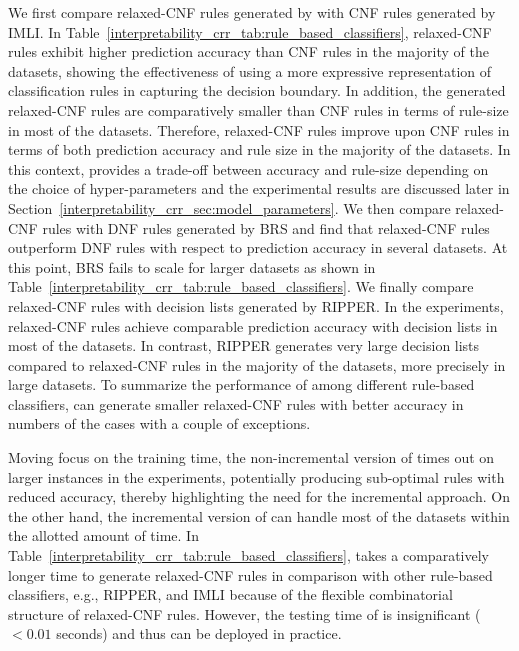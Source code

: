 We first compare relaxed-CNF rules generated by {\crr} with CNF rules generated by IMLI. In {Table}~\ref{interpretability_crr_tab:rule_based_classifiers}, relaxed-CNF rules exhibit higher prediction accuracy than CNF rules in the majority of the datasets, showing the effectiveness of using a more expressive representation of classification rules in capturing the decision boundary. In addition, the generated relaxed-CNF rules are comparatively smaller than CNF rules in terms of rule-size in most of the datasets. Therefore, relaxed-CNF rules improve upon CNF rules in terms of both prediction accuracy and rule size in the majority of the datasets. In this context, {\crr} provides a trade-off between accuracy and rule-size depending on the choice of hyper-parameters and the experimental results are discussed later in Section~\ref{interpretability_crr_sec:model_parameters}.  We then compare relaxed-CNF rules with DNF rules generated by BRS and find that relaxed-CNF rules outperform DNF rules with respect to prediction accuracy in several datasets. At this point,   BRS fails to scale for larger datasets as shown in Table~\ref{interpretability_crr_tab:rule_based_classifiers}. We finally compare relaxed-CNF rules with decision lists generated by RIPPER.  In the experiments, relaxed-CNF rules achieve comparable prediction accuracy with decision lists in most of the datasets. In contrast,   RIPPER generates very large decision lists compared to relaxed-CNF rules in the majority of the datasets, more precisely in large datasets.  To summarize the performance of {\crr} among different rule-based classifiers,  {\crr} can generate smaller relaxed-CNF rules with better accuracy in numbers of the cases with a couple of exceptions. 



Moving focus on the training time,  the non-incremental version of {\crr} times out on larger instances in the experiments, potentially producing sub-optimal rules with reduced accuracy, thereby highlighting the need for the incremental approach. On the other hand, the incremental version of {\crr} can handle most of the datasets within the allotted amount of time. In Table~\ref{interpretability_crr_tab:rule_based_classifiers}, {\crr} takes a comparatively longer time to generate relaxed-CNF rules in comparison with other rule-based classifiers, e.g., RIPPER, and IMLI because of  the flexible combinatorial structure of relaxed-CNF rules. However, the testing time of {\crr} is insignificant ($ < 0.01 $ seconds) and thus can 
 be deployed in practice.  
 

